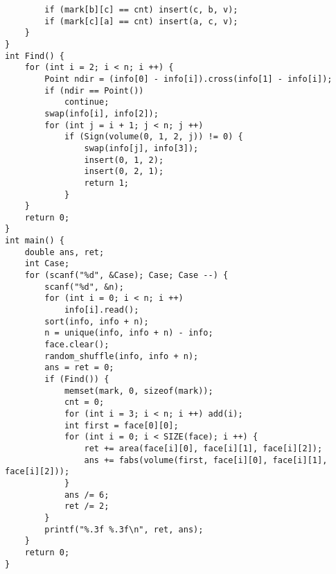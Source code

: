 \begin{lstlisting}
		if (mark[b][c] == cnt) insert(c, b, v);
		if (mark[c][a] == cnt) insert(a, c, v);
	}
}
int Find() {
	for (int i = 2; i < n; i ++) {
		Point ndir = (info[0] - info[i]).cross(info[1] - info[i]);
		if (ndir == Point())
			continue;
		swap(info[i], info[2]);
		for (int j = i + 1; j < n; j ++)
			if (Sign(volume(0, 1, 2, j)) != 0) {
				swap(info[j], info[3]);
				insert(0, 1, 2);
				insert(0, 2, 1);
				return 1;
			}
	}
	return 0;
}
int main() {
	double ans, ret;
	int Case;
	for (scanf("%d", &Case); Case; Case --) {
		scanf("%d", &n);
		for (int i = 0; i < n; i ++)
			info[i].read();
		sort(info, info + n);
		n = unique(info, info + n) - info;
		face.clear();
		random_shuffle(info, info + n);
		ans = ret = 0;
		if (Find()) {
			memset(mark, 0, sizeof(mark));
			cnt = 0;
			for (int i = 3; i < n; i ++) add(i);
			int first = face[0][0];
			for (int i = 0; i < SIZE(face); i ++) {
				ret += area(face[i][0], face[i][1], face[i][2]);
				ans += fabs(volume(first, face[i][0], face[i][1], face[i][2]));
			}
			ans /= 6;
			ret /= 2;
		}
		printf("%.3f %.3f\n", ret, ans);
	}
	return 0;
}
\end{lstlisting}

